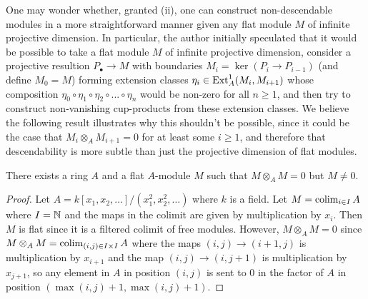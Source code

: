 One may wonder whether, granted (ii), one can construct non-descendable modules in a more straightforward manner given any flat module
$M$ of infinite projective dimension. In particular, the author initially speculated that it would be possible to take a flat module $M$ of infinite projective dimension,
 consider a projective resultion $P_{\bullet} \to M$ with boundaries $M_i = \ker(P_i \to P_{i-1})$ (and define $M_0=M$) forming extension classes $\eta_i \in \operatorname{Ext}^1_A(M_i, M_{i+1})$
whose composition $\eta_0 \circ \eta_1 \circ \eta_2 \circ... \circ \eta_n$ would be non-zero for all $n\ge 1$, and then try to construct non-vanishing cup-products from these extension classes.
We believe the following result illustrates why this shouldn't be possible,
since it could be the case that $M_i \otimes_A M_{i+1}=0$ for at least some $i\ge 1$, and therefore 
that descendability is more subtle than just the projective dimension of flat modules.
\begin{lemma}
There exists a ring $A$ and a flat $A$-module $M$ such that $M \otimes_A M = 0$ but $M \neq 0$.
\end{lemma}
\begin{proof}
Let $A=k[x_1, x_2, \ldots]/(x_1^2, x_2^2, \ldots)$ where $k$ is a field. Let $M=\operatorname*{colim}_{i \in I} A$ where $I=\mathbb{N}$ and the 
maps in the colimit are given by multiplication by $x_i$.
Then $M$ is flat since it is a filtered colimit of free modules. However, $M \otimes_A M = 0$ since $M \otimes_A M = \operatorname*{colim}_{(i,j) \in I \times I} A$ 
where the maps $(i,j) \to (i+1,j)$ is multiplication by $x_{i+1}$ and the map $(i,j) \to (i,j+1)$ is multiplication by 
$x_{j+1}$, so any element in $A$ in position $(i,j)$ is sent to $0$ in the factor of $A$ in position $(\max(i,j)+1, \max(i,j)+1)$.
\end{proof}

